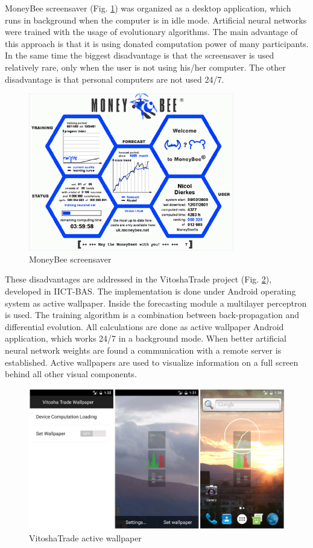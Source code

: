 \documentclass[runningheads]{llncs}
\begin{document}
MoneyBee screensaver (Fig. \ref{fig01}) was organized as a desktop application, which runs in background when the computer is in idle mode. Artificial neural networks were trained with the usage of evolutionary algorithms. The main advantage of this approach is that it is using donated computation power of many participants. In the same time the biggest disadvantage is that the screensaver is used relatively rare, only when the user is not using his/her computer. The other disadvantage is that personal computers are not used 24/7.

\begin{figure}
\includegraphics[width=0.8\textwidth]{fig01.png}
\centering
\caption{MoneyBee screensaver} \label{fig01}
\end{figure}
\FloatBarrier

These disadvantages are addressed in the VitoshaTrade project (Fig. \ref{fig02}), developed in IICT-BAS. The implementation is done under Android operating system as active wallpaper. Inside the forecasting module a multilayer perceptron is used. The training algorithm is a combination between back-propagation and differential evolution. All calculations are done as active wallpaper Android application, which works 24/7 in a background mode. When better artificial neural network weights are found a communication with a remote server is established. Active wallpapers are used to visualize information on a full screen behind all other visual components. 

\begin{figure}
\includegraphics[width=1.0\textwidth]{fig02.png}
\centering
\caption{VitoshaTrade active wallpaper} \label{fig02}
\end{figure}
\FloatBarrier
\end{document}
